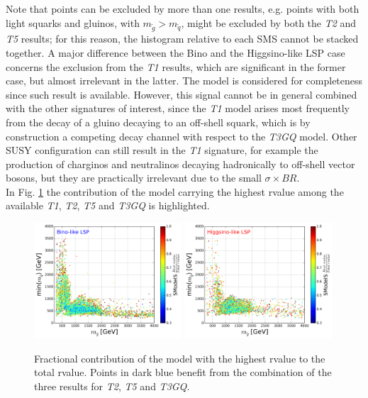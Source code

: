 \documentclass[a4paper,10pt]{article}
\begin{document}
%
Note that points can be excluded by more than one results, e.g. points with both light squarks and gluinos, with $m_{\tilde g} > m_{\tilde q}$, might be excluded by both the \textit{T2} and \textit{T5} results; for this reason, the histogram relative to each SMS cannot be stacked together. A major difference between the Bino and the Higgsino-like LSP case concerns the exclusion from the \textit{T1} results, which are significant in the former case, but almost irrelevant in the latter. The model is considered for completeness since such result is available. However, this signal cannot be in general combined with the other signatures of interest, since the \textit{T1} model arises most frequently from the decay of a gluino decaying to an off-shell squark, which is by construction a competing decay channel with respect to the \textit{T3GQ} model. Other SUSY configuration can still result in the \textit{T1} signature, for example the production of charginos and neutralinos decaying hadronically to off-shell vector bosons, but they are practically irrelevant due to the small $\sigma \times BR$.  
\\
In Fig. \ref{rValues} the contribution of the model carrying the highest rvalue among the available \textit{T1}, \textit{T2}, \textit{T5} and \textit{T3GQ} is highlighted. 
\begin{figure}[!]
\begin{center}
\subfigure
\includegraphics[width=0.49\textwidth]{PLOTS/Weights/BINO_rValus_Glu_Sq_Ratio.png}
\subfigure
{\includegraphics[width=0.49\textwidth]{PLOTS/Weights/HIGGSINO_rValus_Glu_Sq_Ratio.png}}
\end{center}
\caption{Fractional contribution of the model with the highest rvalue to the total rvalue. Points in dark blue benefit from the combination of the three results for \textit{T2}, \textit{T5} and \textit{T3GQ}.} 
\label{rValues}
\end{figure}
\end{document}
